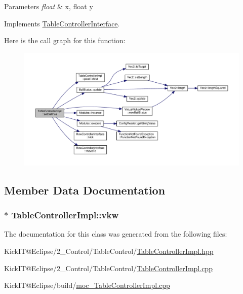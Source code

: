 \begin{DoxyParams}{Parameters}
{\em float} & x, float y \\
\hline
\end{DoxyParams}


Implements \hyperlink{class_table_controller_interface_ac699a40e0bec06283eb955829982cf07}{Table\+Controller\+Interface}.



Here is the call graph for this function\+:\nopagebreak
\begin{figure}[H]
\begin{center}
\leavevmode
\includegraphics[width=350pt]{class_table_controller_impl_aee69b16268f5a6e2578a58dde481dddf_cgraph}
\end{center}
\end{figure}




\subsection{Member Data Documentation}
\subsubsection[{\texorpdfstring{vkw}{vkw}}]{$\ast$ Table\+Controller\+Impl\+::vkw\hspace{0.3cm}{\ttfamily [protected]}}\hypertarget{class_table_controller_impl_af7dbc908fb9205938c254f748649d555}{}\label{class_table_controller_impl_af7dbc908fb9205938c254f748649d555}


The documentation for this class was generated from the following files\+:\begin{DoxyCompactItemize}
\item 
Kick\+I\+T@\+Eclipse/2\+\_\+\+Control/\+Table\+Control/\hyperlink{_table_controller_impl_8hpp}{Table\+Controller\+Impl.\+hpp}\item 
Kick\+I\+T@\+Eclipse/2\+\_\+\+Control/\+Table\+Control/\hyperlink{_table_controller_impl_8cpp}{Table\+Controller\+Impl.\+cpp}\item 
Kick\+I\+T@\+Eclipse/build/\hyperlink{moc___table_controller_impl_8cpp}{moc\+\_\+\+Table\+Controller\+Impl.\+cpp}\end{DoxyCompactItemize}
